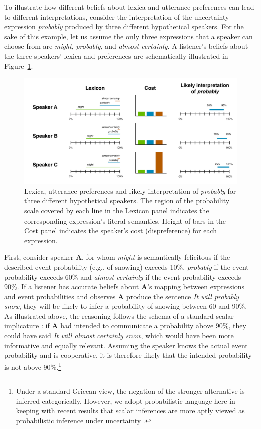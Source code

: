 \documentclass[man, floatsintext]{apa6}
\begin{document}
To illustrate how different beliefs about lexica and utterance preferences can lead to different interpretations, consider the interpretation 
of the uncertainty expression \textit{probably} produced by three different hypothetical speakers. For the sake of this example, 
let us assume the only three expressions that a speaker can choose from are \textit{might}, \textit{probably}, and \textit{almost certainly}.
A listener's beliefs about the three speakers' lexica and preferences are schematically illustrated in Figure~\ref{fig:inference-example}.

\begin{figure}
\center
\includegraphics[width=\textwidth]{plots/implicatures.pdf}
\caption{Lexica, utterance preferences and likely interpretation of \textit{probably} for three different hypothetical speakers. The region of the probability scale covered by each line in the Lexicon panel indicates the corresponding expression's literal semantics. Height of bars in the Cost panel indicates the speaker's cost (dispreference) for each expression. }
\label{fig:inference-example}
\end{figure}

First, consider speaker {\bf A}, for whom \textit{might} is semantically felicitous if the described event probability (e.g., of snowing) exceeds 10\%, 
\textit{probably} if the event probability exceeds 60\% and \textit{almost certainly}  if the event probability exceeds 90\%.  If a listener has accurate beliefs about {\bf A}'s mapping between expressions and event probabilities and observes {\bf A}  produce the sentence \emph{It will probably snow}, they will be likely to infer a probability of snowing between 60 and 90\%. As illustrated above, the reasoning follows the schema of a standard scalar implicature \parencite{Grice1975, Horn1984}: if  {\bf A} had intended to communicate a probability above 90\%, they could have said \emph{It will almost certainly snow}, which would have been more informative and equally relevant. Assuming the speaker knows the actual event probability and is cooperative, it is therefore likely that the intended probability is not above 90\%.\footnote{Under a standard Gricean view, the negation of the stronger alternative is inferred categorically. However, we adopt probabilistic language here in keeping with recent results that scalar inferences are more aptly viewed as probabilistic inference under uncertainty \parencite{Goodman2013}.} 
\end{document}
